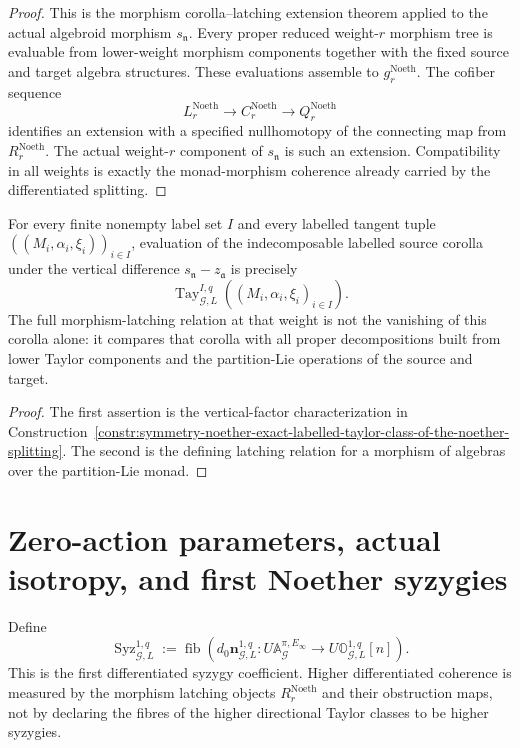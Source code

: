 \begin{proof}
This is the morphism corolla--latching extension theorem applied to the actual
algebroid morphism $s_{\mathfrak n}$.  Every proper reduced weight-$r$ morphism
tree is evaluable from lower-weight morphism components together with the fixed
source and target algebra structures.  These evaluations assemble to
$g_r^{\mathrm{Noeth}}$.  The cofiber sequence
\[
L_r^{\mathrm{Noeth}}
\longrightarrow
C_r^{\mathrm{Noeth}}
\longrightarrow
Q_r^{\mathrm{Noeth}}
\]
identifies an extension with a specified nullhomotopy of the connecting map from
$R_r^{\mathrm{Noeth}}$.  The actual weight-$r$ component of
$s_{\mathfrak n}$ is such an extension.  Compatibility in all weights is exactly
the monad-morphism coherence already carried by the differentiated splitting.
\end{proof}

\begin{proposition}
\label{prop:symmetry-noether-relation-with-the-taylor-classes}
For every finite nonempty label set $I$ and every labelled tangent tuple
$((M_i,\alpha_i,\xi_i))_{i\in I}$, evaluation of the indecomposable labelled source
corolla under the vertical difference
$s_{\mathfrak n}-z_{\mathfrak a}$ is precisely
\[
\operatorname{Tay}_{\mathcal G,L}^{I,q}
\left((M_i,\alpha_i,\xi_i)_{i\in I}\right).
\]
The full morphism-latching relation at that weight is not the vanishing of this
corolla alone: it compares that corolla with all proper decompositions built from
lower Taylor components and the partition-Lie operations of the source and target.
\end{proposition}

\begin{proof}
The first assertion is the vertical-factor characterization in
Construction~\ref{constr:symmetry-noether-exact-labelled-taylor-class-of-the-noether-splitting}.
The second is the defining latching relation for a morphism of algebras over the
partition-Lie monad.
\end{proof}

\section{Zero-action parameters, actual isotropy, and first Noether syzygies}
\label{sec:symmetry-noether-zero-action-parameters-actual-isotropy-and-first-noether-syzygies}

\begin{definition}
\label{def:symmetry-noether-first-noether-syzygy-coefficient}
Define
\[
\boxed{
\operatorname{Syz}_{\mathcal G,L}^{1,q}
:=
\operatorname{fib}
\left(
d_0\mathbf n_{\mathcal G,L}^{1,q}:
U\mathbb A_{\mathcal G}^{\pi,E_\infty}
\longrightarrow
U\mathbb O_{\mathcal G,L}^{1,q}[n]
\right).
}
\]
This is the first differentiated syzygy coefficient.  Higher differentiated
coherence is measured by the morphism latching objects
$R_r^{\mathrm{Noeth}}$ and their obstruction maps, not by declaring the fibres of
the higher directional Taylor classes to be higher syzygies.
\end{definition}


